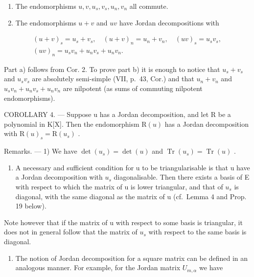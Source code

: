 \begin{enumerate}
\def\labelenumi{\alph{enumi})}
\item
  The endomorphisms \(u, v, u_s, v_s, u_n, v_n\) all commute.
\item
  The endomorphisms \(u + v\) and \(uv\) have Jordan decompositions with
\end{enumerate}

\[
\begin{array}{c} (u + v) _ {s} = u _ {s} + v _ {s}, \quad (u + v) _ {n} = u _ {n} + v _ {n}, \quad (u v) _ {s} = u _ {s} v _ {s}, \\ (u v) _ {n} = u _ {s} v _ {n} + u _ {n} v _ {s} + u _ {n} v _ {n}. \end{array}
\]

Part a) follows from Cor. 2. To prove part b) it is enough to notice that \(u_{s} + v_{s}\) and \(u_{s}v_{s}\) are absolutely semi-simple (VII, p.~43, Cor.) and that \(u_{n} + v_{n}\) and \(u_{s}v_{n} + u_{n}v_{s} + u_{n}v_{n}\) are nilpotent (as sums of commuting nilpotent endomorphisms).

COROLLARY 4. --- Suppose u has a Jordan decomposition, and let R be a polynomial in K{[}X{]}. Then the endomorphism \(\mathrm{R}(u)\) has a Jordan decomposition with \(\mathrm{R}(u)_{s} = \mathrm{R}(u_{s})\) .

Remarks. --- 1) We have \(\det(u_s) = \det(u)\) and \(\operatorname{Tr}(u_s) = \operatorname{Tr}(u)\) .

\begin{enumerate}
\def\labelenumi{\arabic{enumi})}
\setcounter{enumi}{1}
\tightlist
\item
  A necessary and sufficient condition for u to be triangularisable is that u have a Jordan decomposition with \(u_{s}\) diagonalisable. Then there exists a basis of E with respect to which the matrix of u is lower triangular, and that of \(u_{s}\) is diagonal, with the same diagonal as the matrix of u (cf.~Lemma 4 and Prop. 19 below).
\end{enumerate}

Note however that if the matrix of u with respect to some basis is triangular, it does not in general follow that the matrix of \(u_{s}\) with respect to the same basis is diagonal.

\begin{enumerate}
\def\labelenumi{\arabic{enumi})}
\setcounter{enumi}{2}
\tightlist
\item
  The notion of Jordan decomposition for a square matrix can be defined in an analogous manner. For example, for the Jordan matrix \(U_{m,\alpha}\) we have
\end{enumerate}

